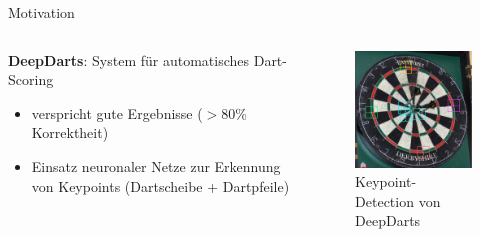 \begin{frame}{Motivation}

    \begin{columns}
        \begin{column}{0.6\linewidth}

            \textbf{DeepDarts}: System für automatisches Dart-Scoring
            \begin{itemize}
                \item verspricht gute Ergebnisse ($>80\%$ Korrektheit)
                \item Einsatz neuronaler Netze zur Erkennung von Keypoints (Dartscheibe + Dartpfeile)
            \end{itemize}

        \end{column}
        \begin{column}{0.4\linewidth}

            \begin{figure}
                \centering
                \includegraphics[width=0.8\linewidth]{imgs/dd_keypoints.pdf}
                \vspace*{-0.2cm}
                \caption{Keypoint-Detection von DeepDarts}
            \end{figure}

        \end{column}
    \end{columns}

    \vspace*{-0.2cm}


\end{frame}

